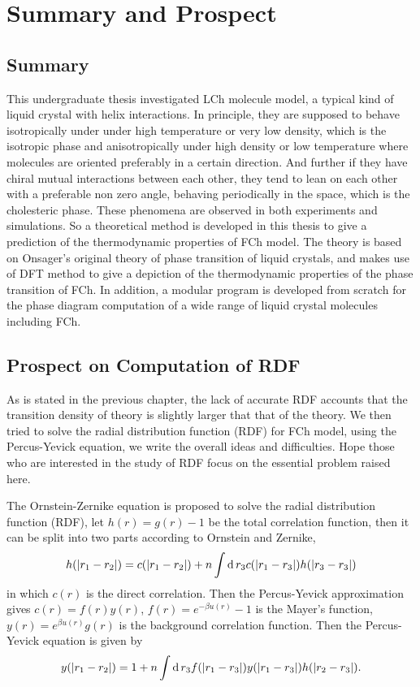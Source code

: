 
\chapter{Summary and Prospect}

\section{Summary}

This undergraduate thesis investigated LCh molecule model, a typical kind of liquid crystal with helix interactions. In principle, they are supposed to behave isotropically under under high temperature or very low density, which is the isotropic phase and anisotropically under high density or low temperature where molecules are oriented preferably in a certain direction. And further if they have chiral mutual interactions between each other, they tend to lean on each other with a preferable non zero angle, behaving periodically in the space, which is the cholesteric phase. These phenomena are observed in both experiments and simulations\cite{Liang2017SM}. So a theoretical method is developed in this thesis to give a prediction of the thermodynamic properties of FCh model. The theory is based on Onsager's original theory\cite{Onsager1949NYAS} of phase transition of liquid crystals, and makes use of DFT method to give a depiction of the thermodynamic properties of the phase transition of FCh. In addition, a modular program is developed from scratch for the phase diagram computation of a wide range of liquid crystal molecules including FCh.

\section{Prospect on Computation of RDF}
As is stated in the previous chapter, the lack of accurate RDF accounts that the transition density of theory is slightly larger that that of the theory. We then tried to solve the radial distribution function (RDF) for FCh model, using the Percus-Yevick equation, we write the overall ideas and difficulties. Hope those who are interested in the study of RDF focus on the essential problem raised here.

The Ornstein-Zernike equation is proposed to solve the radial distribution function (RDF), let $h(r)=g(r)-1$ be the total correlation function, then it can be split into two parts according to Ornstein and Zernike\cite{Ornstein1914OZeqn},
\begin{equation}
	h(|r_1-r_2|)=c(|r_1-r_2|)+n\int\operatorname{d}r_3c(|r_1-r_3|)h(|r_3-r_3|)
\end{equation}
in which $c(r)$ is the direct correlation. Then the Percus-Yevick approximation gives $c(r)=f(r)y(r)$, $f(r)=e^{-\beta u(r)}-1$ is the Mayer's function, $y(r)=e^{\beta u(r)}g(r)$ is the background correlation function. Then the Percus-Yevick equation is given by
\begin{equation}\label{Eqn:OrdPY}
	y(|r_1-r_2|)=1+n\int\operatorname{d}r_3f(|r_1-r_3|)y(|r_1-r_3|)h(|r_2-r_3|).
\end{equation}

